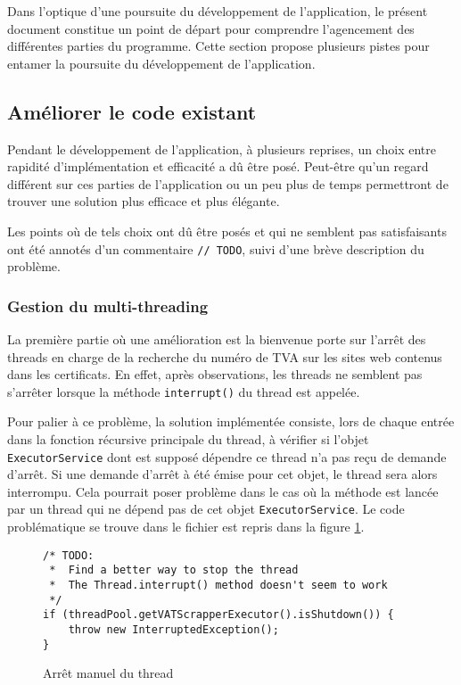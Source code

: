 \documentclass{article}
\begin{document}
Dans l'optique d'une poursuite du développement de l'application, le présent document constitue un point de départ pour comprendre l'agencement des différentes parties du programme.  Cette section propose plusieurs pistes pour entamer la poursuite du développement de l'application.


\subsection{Améliorer le code existant}

Pendant le développement de l'application, à plusieurs reprises, un choix entre rapidité d'implémentation et efficacité a dû être posé.  Peut-être qu'un regard différent sur ces parties de l'application ou un peu plus de temps permettront de trouver une solution plus efficace et plus élégante.

Les points où de tels choix ont dû être posés et qui ne semblent pas satisfaisants ont été annotés d'un commentaire \texttt{// TODO}, suivi d'une brève description du problème.

\subsubsection{Gestion du multi-threading}

La première partie où une amélioration est la bienvenue porte sur l'arrêt des threads en charge de la recherche du numéro de TVA sur les sites web contenus dans les certificats.  En effet, après observations, les threads ne semblent pas s'arrêter lorsque la méthode \texttt{interrupt()} du thread est appelée.

Pour palier à ce problème, la solution implémentée consiste, lors de chaque entrée dans la fonction récursive principale du thread, à vérifier si l'objet \texttt{ExecutorService} dont est supposé dépendre ce thread n'a pas reçu de demande d'arrêt.  Si une demande d'arrêt à été émise pour cet objet, le thread sera alors interrompu. Cela pourrait poser problème dans le cas où la méthode est lancée par un thread qui ne dépend pas de cet objet \texttt{ExecutorService}.  Le code problématique se trouve dans le fichier  est repris dans la figure \ref{thread-fig}. 


\begin{figure}[h]
\centering
\begin{verbatim}
/* TODO:
 *  Find a better way to stop the thread
 *  The Thread.interrupt() method doesn't seem to work
 */
if (threadPool.getVATScrapperExecutor().isShutdown()) {
    throw new InterruptedException();
}
\end{verbatim}
\caption{Arrêt manuel du thread}
\label{thread-fig}
\end{figure}
\end{document}
